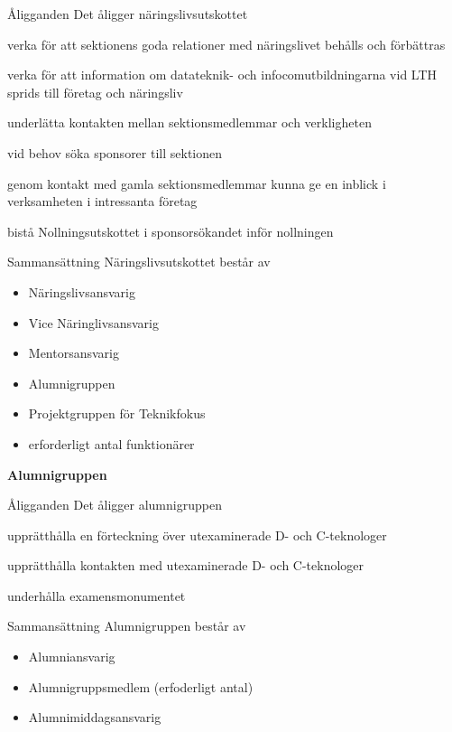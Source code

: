 \documentclass[pdfbookmarks,a4paper,11pt]{article}
\newlength{\itemcollength}
\newenvironment{reglemlista}{%
  \begin{list}{}{%
      \setlength{\labelwidth}{\itemcollength}%
      \setlength{\leftmargin}{\labelwidth + \labelsep}%
      \renewcommand{\makelabel}[1]{%
        \raisebox{0pt}[1ex][0pt]{%
          \makebox[\labelwidth][l]{%
            \parbox[t]{\itemcollength}{%
              \raggedright\hspace{0pt}##1}}}\hfill}%
      }}{%
  \end{list}}
\begin{document}
\begin{reglemlista}

	\item[Åligganden]
	Det åligger näringslivsutskottet
	\begin{attlista}
		\item verka för att sektionens goda relationer med näringslivet behålls och förbättras
		\item verka för att information om datateknik- och infocomutbildningarna vid LTH sprids till företag och näringsliv
		\item underlätta kontakten mellan sektionsmedlemmar och verkligheten
		\item vid behov söka sponsorer till sektionen
		\item genom kontakt med gamla sektionsmedlemmar kunna ge en inblick i verksamheten i intressanta företag
		\item bistå Nollningsutskottet i sponsorsökandet inför nollningen
	\end{attlista}

	\item[Sammansättning]
	Näringslivsutskottet består av
	\begin{itemize}
		\item Näringslivsansvarig
		\item Vice Näringlivsansvarig
		\item Mentorsansvarig
		\item Alumnigruppen
		\item Projektgruppen för Teknikfokus
		\item erforderligt antal funktionärer
	\end{itemize}

	\item[\textbf{Alumnigruppen}]

	\item[Åligganden]
	Det åligger alumnigruppen
	\begin{attlista}
		\item  upprätthålla en förteckning över utexaminerade D- och C-teknologer
		\item upprätthålla kontakten med utexaminerade D- och C-teknologer
		\item underhålla examensmonumentet
	\end{attlista}

	\item[Sammansättning]
	Alumnigruppen består av
	\begin{itemize}
		\item Alumniansvarig
		\item Alumnigruppsmedlem (erfoderligt antal)
		\item Alumnimiddagsansvarig
	\end{itemize}

\end{reglemlista}
\end{document}
